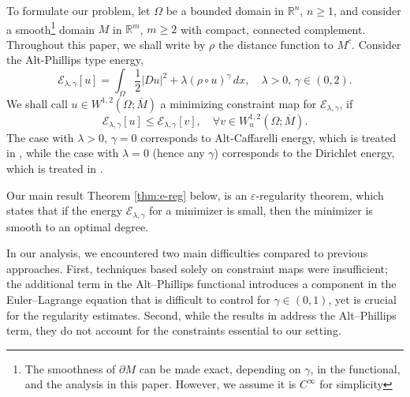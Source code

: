 \documentclass[11pt]{amsart}
\newcommand{\R}{{\mathbb R}}
\newcommand{\cE}{{\mathcal E}}
\theoremstyle{plain}
\theoremstyle{definition}
\theoremstyle{remark}
\numberwithin{equation}{section}
\begin{document}
To formulate our problem,  let $\Omega$ be a bounded domain in $\R^n$, $n \geq 1$, and consider a smooth\footnote{The smoothness of $\partial M$ can be made exact, depending on $\gamma$, in the functional, and the analysis in this paper. However, we assume it is $C^\infty$ for simplicity}
domain $M$ in $\R^m$, $m \geq 2$ with compact, connected complement. Throughout this paper, we shall write by $\rho$ the distance function to $M^c$. Consider the Alt-Phillips type energy,
\begin{equation*}
\cE_{\lambda,\gamma}[u]= \int_{\Omega} \frac{1}{2}|Du|^2 + {\lambda}(\rho\circ u)^\gamma\,dx,\quad \lambda >  0, \,\gamma \in (0,2). 
\end{equation*}
We shall call $u\in W^{1,2}(\Omega;\overline M)$ a minimizing constraint map for $\cE_{\lambda,\gamma}$, if 
$$
\cE_{\lambda,\gamma}[u]\leq \cE_{\lambda,\gamma}[v],\quad\forall v\in W_u^{1,2}(\Omega;\overline M). 
$$
The case with $\lambda>0$, $\gamma = 0$ corresponds to Alt-Caffarelli energy, which is treated in \cite{FGKS1}, while the case with $\lambda = 0$ (hence any $\gamma$) corresponds to the Dirichlet energy, which is treated in \cite{FGKS2}. 

Our main result Theorem \ref{thm:e-reg} below, is an $\varepsilon$-regularity theorem, which  
states that if the energy $\cE_{\lambda,\gamma}$ for a minimizer  is small, then the minimizer is  smooth to an optimal degree.


In our analysis, we encountered two main difficulties compared to previous approaches. 
First, techniques based solely on constraint maps were insufficient; the additional term 
in the Alt--Phillips functional introduces a component in the Euler--Lagrange equation 
that is difficult to control for $\gamma \in (0,1)$, yet is crucial for the regularity 
estimates. Second, while the results in \cite{GG2} address the Alt--Phillips term, 
they do not account for the constraints essential to our setting.
\end{document}
